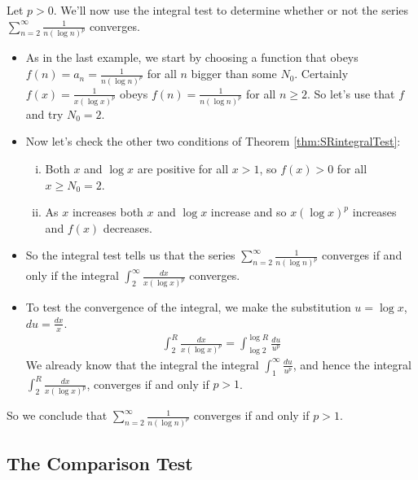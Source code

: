 \begin{eg}[$\sum\limits_{n=2}^\infty\frac{1}{n(\log n)^p}$]\label{eg:SRlnpTest}
Let $p>0$. We'll now use the integral test to determine whether or not the
series $\sum\limits_{n=2}^\infty\frac{1}{n(\log n)^p}$ converges.
\begin{itemize}
\item
As in the last example, we start by choosing a function that obeys
$f(n)=a_n=\frac{1}{n(\log n)^p}$ for all $n$
bigger than some $N_0$. Certainly $f(x)=\frac{1}{x(\log x)^p}$ obeys
$f(n)=\frac{1}{n(\log n)^p}$ for all $n\ge 2$. So let's use that $f$ and
try $N_0=2$.
\item
Now let's check the other two conditions of
Theorem \ref{thm:SRintegralTest}:
\begin{enumerate}[(i)]
\item Both $x$ and $\log x$ are positive for all $x>1$, so $f(x)>0$ for all $x\ge N_0=2$.
\item  As $x$ increases both $x$ and $\log x$ increase and so $x(\log x)^p$
increases and $f(x)$ decreases.
\end{enumerate}
\item
So the integral test tells us that the series
$\sum\limits_{n=2}^\infty\frac{1}{n(\log n)^p}$ converges if and only if
the integral $\int_2^\infty\frac{dx}{x (\log x)^p}$ converges.
\item
To test
the convergence of the integral, we make the substitution $u=\log x$,
$du=\frac{dx}{x}$.
\begin{align*}
\int_2^R \frac{dx}{x (\log x)^p}
=\int_{\log 2}^{\log R}\frac{du}{u^p}
\end{align*}
 We already know that the integral the integral $\int_1^\infty\frac{du}{u^p}$,
and hence the integral $\int_2^R \frac{dx}{x (\log x)^p}$, converges if and
only if $p>1$.
\end{itemize}
So we conclude that
$\sum\limits_{n=2}^\infty\frac{1}{n(\log n)^p}$
converges if and only if $p>1$.
\end{eg}

\subsection{The Comparison Test}

